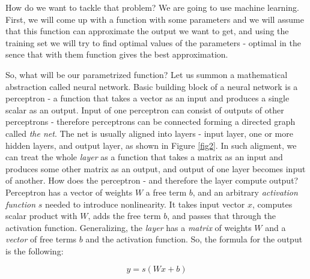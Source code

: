 \documentclass[3p,twocolumn]{elsarticle}
\begin{document}
How do we want to tackle that problem? We are going to use machine learning. First, we will come up with a function with some parameters and we will assume that this function can approximate the output we want to get, and using the training set we will try to find optimal values of the parameters - optimal in the sence that with them function gives the best approximation.

So, what will be our parametrized function? Let us summon a mathematical abstraction called neural network. Basic building block of a neural network is a perceptron - a function that takes a vector as an input and produces a single scalar as an output. Input of one perceptron can consist of outputs of other perceptrons - therefore perceptrons can be connected forming a directed graph called \emph{the net}. The net is usually aligned into layers - input layer, one or more hidden layers, and output layer, as shown in Figure \ref{fig2}. In such aligment, we can treat the whole \emph{layer} as a function that takes a matrix as an input and produces some other matrix as an output, and output of one layer becomes input of another. How does the perceptron - and therefore the layer compute output? Perceptron has a vector of weights $W$ a free term $b$, and an arbitrary \emph{activation function} $s$ needed to introduce nonlinearity. It takes input vector $x$, computes scalar product with $W$, adds the free term $b$, and passes that through the activation function. Generalizing, the \emph{layer} has a \emph{matrix} of weights $W$ and a \emph{vector} of free terms $b$ and the activation function. So, the formula for the output is the following:

\[ y = s(Wx + b) \]
\end{document}
